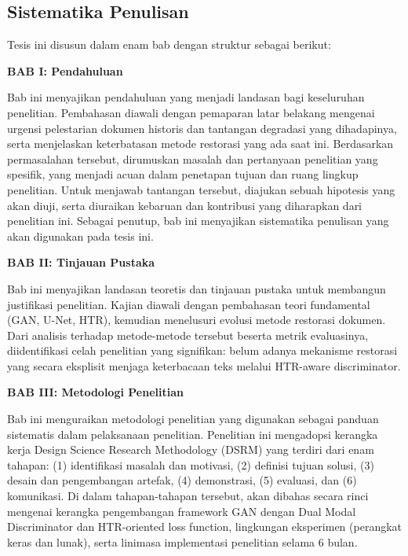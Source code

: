 \documentclass[12pt,a4paper]{article}
\begin{document}
\subsection{Sistematika Penulisan}
\label{subsec:sistematika}

Tesis ini disusun dalam enam bab dengan struktur sebagai berikut:

\vspace{0.5em}
\textbf{BAB I: Pendahuluan}

Bab ini menyajikan pendahuluan  yang menjadi landasan bagi keseluruhan penelitian. Pembahasan diawali dengan pemaparan latar belakang mengenai urgensi pelestarian dokumen historis dan tantangan degradasi yang dihadapinya, serta menjelaskan keterbatasan metode restorasi yang ada saat ini. Berdasarkan permasalahan tersebut, dirumuskan masalah dan pertanyaan penelitian yang spesifik, yang menjadi acuan dalam penetapan tujuan dan ruang lingkup penelitian. Untuk menjawab tantangan tersebut, diajukan sebuah hipotesis yang akan diuji, serta diuraikan kebaruan dan kontribusi yang diharapkan dari penelitian ini. Sebagai penutup, bab ini menyajikan sistematika penulisan yang akan digunakan pada tesis ini.

\vspace{0.5em}
\textbf{BAB II: Tinjauan Pustaka}

Bab ini menyajikan landasan teoretis dan tinjauan pustaka untuk membangun justifikasi penelitian. Kajian diawali dengan pembahasan teori fundamental (GAN, U-Net, HTR), kemudian menelusuri evolusi metode restorasi dokumen. Dari analisis  terhadap metode-metode tersebut beserta metrik evaluasinya, diidentifikasi celah penelitian yang signifikan: belum adanya mekanisme restorasi yang secara eksplisit menjaga keterbacaan teks melalui HTR-aware discriminator.

\vspace{0.5em}
\textbf{BAB III: Metodologi Penelitian}

Bab ini menguraikan metodologi penelitian yang digunakan sebagai panduan sistematis dalam pelaksanaan penelitian. Penelitian ini mengadopsi kerangka kerja Design Science Research Methodology (DSRM) yang terdiri dari enam tahapan: (1) identifikasi masalah dan motivasi, (2) definisi tujuan solusi, (3) desain dan pengembangan artefak, (4) demonstrasi, (5) evaluasi, dan (6) komunikasi. Di dalam tahapan-tahapan tersebut, akan dibahas secara rinci mengenai kerangka pengembangan framework GAN dengan Dual Modal Discriminator dan HTR-oriented loss function, lingkungan eksperimen (perangkat keras dan lunak), serta linimasa implementasi penelitian selama 6 bulan.
\end{document}
